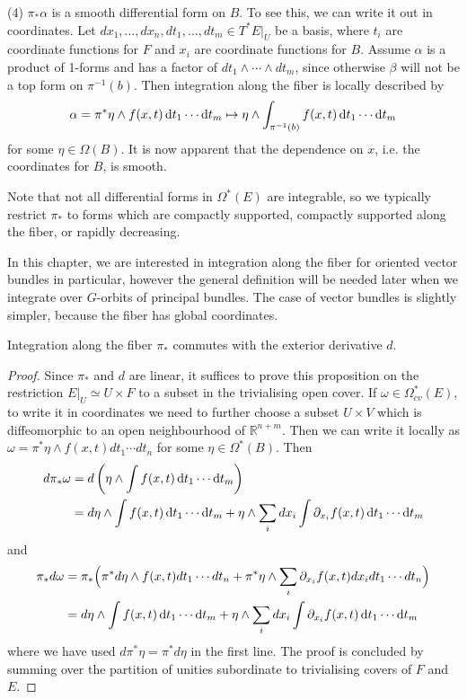 (4) $\pi_*\alpha$ is a smooth differential form on $B$. To see this, we can
write it out in coordinates. Let 
$dx_1,\ldots,dx_{n},dt_1,\ldots,dt_m \in T^*E|_U$ be a basis, where
$t_i$ are coordinate functions for $F$ and $x_i$ are coordinate functions for
$B$. Assume $\alpha$ is a product of 1-forms and has a factor of 
$dt_1\wedge \cdots\wedge dt_m$, since
otherwise $\beta$ will not be a top form on $\pi^{-1}(b)$. Then integration
along the fiber is locally described by 
\[
\alpha = \pi^*\eta \wedge f(x,t) \odif{t_1}\cdots \odif{t_m}   
\mapsto \eta\wedge \int_{\pi^{-1}(b)} f(x,t) \odif{t_1}\cdots \odif{t_m}
\] 
for some $\eta\in \Omega(B)$. It is now apparent that the dependence on $x$,
i.e. the coordinates for  $B$, is smooth. 
\begin{remark}
	Note that not all differential forms in $\Omega^*(E)$ are integrable, 
	so we typically restrict $\pi_*$ to forms which
	are compactly supported, compactly supported along the fiber, or rapidly
	decreasing. 
\end{remark}
In this chapter, we are interested in integration along the fiber for oriented
vector bundles in particular, however the general definition will be needed
later when we integrate over $G$-orbits of principal bundles. The case of vector
bundles is slightly simpler, because the fiber has global coordinates. 
\begin{prop} %
	Integration along the fiber $\pi_*$ commutes with the exterior derivative
	$d$.
\end{prop}
\begin{proof}
	Since $\pi_*$ and  $d$ are linear,
	it suffices to prove this proposition on the restriction $E|_U \simeq
	U\times F$ to a subset in the trivialising open cover. If $\omega\in
	\Omega_{cv}^*(E)$, to write it in coordinates we need to further choose a
	subset $U\times V$ which is diffeomorphic to an open neighbourhood of
	$\mathbb{R}^{n+m}$. Then
	we can write it locally as $\omega = \pi^*\eta \wedge f(x,t) dt_1\cdots
	dt_n$ for some $\eta\in \Omega^*(B)$. Then 
	\begin{align*}
		d\pi_*\omega
		&= d \paren{\eta\wedge \int f(x,t)\odif{t_1}\cdots\odif{t_m} } \\
		&= d\eta\wedge\int f(x,t)\odif{t_1}\cdots\odif{t_m}  
		+\eta\wedge \sum_i dx_i\int \partial_{x_i} f(x,t)\odif{t_1}\cdots\odif{t_m} 
	\end{align*}
	and 
	\begin{align*}
		\pi_*d\omega
		&= \pi_*\paren[2]{\pi^*d\eta\wedge f(x,t) dt_1\cdots
		dt_n + \pi^*\eta \wedge\sum_i \partial_{x_i}f(x,t) dx_i dt_1\cdots
		dt_n } \\
		&= d\eta\wedge\int f(x,t)\odif{t_1}\cdots\odif{t_m} + \eta \wedge
		\sum_i dx_i\int \partial_{x_i} f(x,t)\odif{t_1}\cdots\odif{t_m} 
	\end{align*}
	where we have used $d\pi^*\eta = \pi^*d\eta$ in the first line. The proof is
	concluded by summing over the partition of unities subordinate to
	trivialising covers of $F$ and $E$.
\end{proof}
